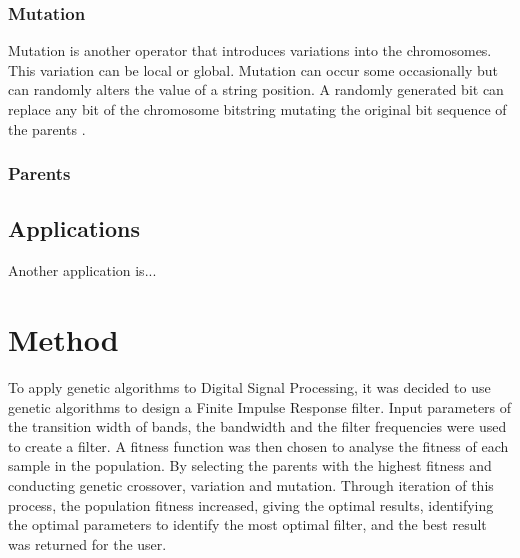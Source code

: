 \documentclass[a4paper, 11pt]{article}
\begin{document}
        \subsubsection{Mutation}
            Mutation is another operator that introduces variations into the chromosomes. This variation can be
            local or global. Mutation can occur some occasionally but can randomly alters the value of a string
            position. A randomly generated bit can replace any bit of the chromosome bitstring mutating the original
            bit sequence of the parents \cite{Tang1996}.
        \subsubsection{Parents}
        
        \subsection{Applications}
        Another application is...

\section{Method}\label{sec:meth}
    To apply genetic algorithms to Digital Signal Processing, it was decided to use genetic algorithms to design a 
    Finite Impulse Response filter. Input parameters of the transition width of bands, the bandwidth
    and the filter frequencies were used to create a filter. A fitness function was then chosen to analyse the fitness
    of each sample in the population. By selecting the parents with the highest fitness and conducting genetic crossover,
    variation and mutation. Through iteration of this process, the population fitness increased, giving the optimal results, 
    identifying the optimal parameters to identify the most optimal filter, and the best result was returned for the user.
\end{document}
